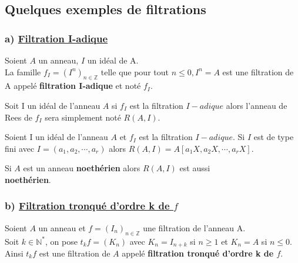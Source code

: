 \subsection{Quelques exemples de filtrations}
\subsubsection{a) \underline{Filtration I-adique}}
\begin{madefinition}
	Soient $A$ un anneau, $I$ un idéal de A.\\
	La famille $f_I = (I^n)_{n\in \mathbb{Z}}$ telle que pour tout $n \leqslant 0, I^n = A$ est une filtration de A appelé \textbf{filtration I-adique} et noté $f_I.$
\end{madefinition}
\begin{maremarque}
	Soit I un idéal de l'anneau $A$ si $f_I$ est la filtration $I-adique$ alors l'anneau de Rees de $f_I$ sera simplement noté $R(A,I)$.
\end{maremarque}
\begin{maproposition}
	Soient I un idéal de l'anneau $A$ et $f_I$ est la filtration $I-adique$.
	Si $I$ est de type fini avec $I = (a_1, a_2, \cdots, a_r)$ alors $R(A,I) = A[a_1X,a_2X, \cdots, a_rX].$
\end{maproposition}
\begin{maconsequence}
	Si $A$ est un anneau \textbf{noethérien} alors $R(A,I)$ est aussi \\ \textbf{noethérien}.
\end{maconsequence}


\subsubsection{b) \underline{Filtration tronqué d'ordre k de $f$}}
\begin{madefinition}
	Soient $A$ un anneau et $f = (I_n)_{n\in \mathbb{Z}}$ une filtration de l'anneau A.\\
	Soit $k \in \mathbb{N}^{*}$, on pose $t_{k}f=(K_n)$ avec $K_n = I_{n+k}$ si $n \geqslant 1 $ et $K_n = A$ si $n \leqslant 0$.\\
	Ainsi $t_{k}f$ est une filtration de $A$ appelé \textbf{filtration tronqué d'ordre k de $f$}.
\end{madefinition}

